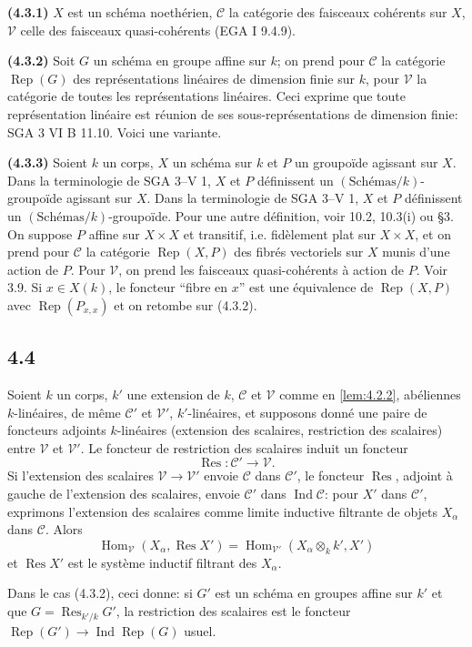 \documentclass[12pt,a4paper]{article}
\theoremstyle{plain}
\theoremstyle{definition}
\theoremstyle{remark}
\DeclareMathOperator{\Hom}{Hom}
\DeclareMathOperator{\Ind}{Ind}
\DeclareMathOperator{\Res}{Res}
\providecommand{\Hom}{\operatorname{Hom}}
\providecommand{\Rep}{\operatorname{Rep}}
\begin{document}
\textbf{(4.3.1)} $X$ est un sch\'ema noeth\'erien, $\mathcal{C}$ la cat\'egorie des
faisceaux coh\'erents sur $X$, $\mathcal{V}$ celle des faisceaux quasi-coh\'erents (EGA I
9.4.9).

\textbf{(4.3.2)} Soit $G$ un sch\'ema en groupe affine sur $k$; on prend pour
$\mathcal{C}$ la cat\'egorie $\Rep(G)$ des repr\'esentations lin\'eaires de dimension finie
sur $k$, pour $\mathcal{V}$ la cat\'egorie de toutes les repr\'esentations lin\'eaires.
Ceci exprime que toute repr\'esentation lin\'eaire est r\'eunion de ses sous-repr\'esentations
de dimension finie: SGA 3 VI B 11.10. Voici une variante.

\textbf{(4.3.3)} Soient $k$ un corps, $X$ un sch\'ema sur $k$ et $P$ un groupoïde agissant sur $X$. Dans la terminologie de SGA 3--V 1, $X$ et $P$ d\'efinissent un
$(\text{Sch\'emas}/k)$-groupoïde agissant sur $X$. Dans la terminologie de SGA 3--V 1, $X$ et $P$ d\'efinissent un
$(\text{Sch\'emas}/k)$-groupoïde. Pour une autre d\'efinition, voir 10.2, 10.3(i) ou
\cite{D4} \S3. On suppose $P$ affine sur $X \times X$ et transitif, i.e. fidèlement
plat sur $X \times X$, et on prend pour $\mathcal{C}$ la cat\'egorie $\Rep(X,P)$ des
fibr\'es vectoriels sur $X$ munis d'une action de $P$. Pour $\mathcal{V}$, on prend les
faisceaux quasi-coh\'erents \`a action de $P$. Voir \cite{D4} 3.9. Si $x \in X(k)$, le
foncteur ``fibre en $x$'' est une \'equivalence de $\Rep(X,P)$ avec $\Rep(P_{x,x})$
et on retombe sur (4.3.2).

\subsection*{4.4}

Soient $k$ un corps, $k'$ une extension de $k$, $\mathcal{C}$ et $\mathcal{V}$ comme en
\ref{lem:4.2.2}, ab\'eliennes $k$-lin\'eaires, de m\^eme $\mathcal{C}'$ et $\mathcal{V}'$,
$k'$-lin\'eaires, et supposons donn\'e une paire de foncteurs adjoints $k$-lin\'eaires
(extension des scalaires, restriction des scalaires) entre $\mathcal{V}$ et $\mathcal{V}'$.
Le foncteur de restriction des scalaires induit un foncteur
\[
\Res: \mathcal{C}' \longrightarrow \mathcal{V}.
\]
Si l'extension des scalaires $\mathcal{V} \to \mathcal{V}'$ envoie $\mathcal{C}$ dans
$\mathcal{C}'$, le foncteur $\Res$, adjoint \`a gauche de l'extension des scalaires,
envoie $\mathcal{C}'$ dans $\Ind\mathcal{C}$: pour $X'$ dans $\mathcal{C}'$, exprimons
l'extension des scalaires comme limite inductive filtrante de objets $X_\alpha$ dans
$\mathcal{C}$. Alors
\[
\Hom_{\mathcal{V}}(X_\alpha, \Res X') = \Hom_{\mathcal{V}'}(X_\alpha \otimes_k k', X')
\]
et $\Res X'$ est le syst\`eme inductif filtrant des $X_\alpha$.

Dans le cas (4.3.2), ceci donne: si $G'$ est un sch\'ema en groupes affine sur $k'$ et
que $G = \Res_{k'/k} G'$, la restriction des scalaires est le foncteur
$\Rep(G') \to \Ind\Rep(G)$ usuel.
\end{document}
